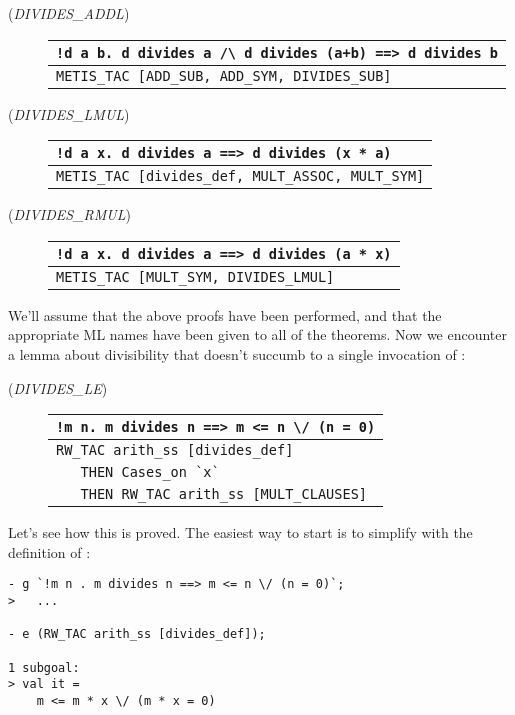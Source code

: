 \begin{description}
\item[\small{({\it DIVIDES\_ADDL\/})}]
\begin{tabular}[t]{l}
\verb|!d a b. d divides a /\ d divides (a+b) ==> d divides b| \\ \hline
 \verb+METIS_TAC [ADD_SUB, ADD_SYM, DIVIDES_SUB]+ \\
\end{tabular}

\item[\small{({\it DIVIDES\_LMUL\/})}]
\begin{tabular}[t]{l}
\verb+!d a x. d divides a ==> d divides (x * a)+ \\ \hline
 \verb+METIS_TAC [divides_def, MULT_ASSOC, MULT_SYM]+ \\
\end{tabular}

\item[\small{({\it DIVIDES\_RMUL\/})}]
\begin{tabular}[t]{l}
\verb+!d a x. d divides a ==> d divides (a * x)+ \\ \hline
 \verb+METIS_TAC [MULT_SYM, DIVIDES_LMUL]+ \\
\end{tabular}

\end{description}

\noindent We'll assume that the above proofs have been performed, and
that the appropriate ML names have been given to all of the theorems.
Now we encounter a lemma about divisibility that doesn't succumb to a
single invocation of :
\begin{description}
\item [\small{({\it DIVIDES\_LE\/})}]
\begin{tabular}[t]{l}
\verb+!m n. m divides n ==> m <= n \/ (n = 0)+ \\ \hline
\verb+RW_TAC arith_ss [divides_def]+ \\
\verb+   THEN Cases_on `x`+ \\
\verb+   THEN RW_TAC arith_ss [MULT_CLAUSES]+ \\
\end{tabular}
\end{description}
Let's see how this is proved. The easiest way to start is to simplify
with the definition of :
\begin{session}
\begin{verbatim}
- g `!m n . m divides n ==> m <= n \/ (n = 0)`;
>   ...

- e (RW_TAC arith_ss [divides_def]);

1 subgoal:
> val it =
    m <= m * x \/ (m * x = 0)
\end{verbatim}
\end{session}

